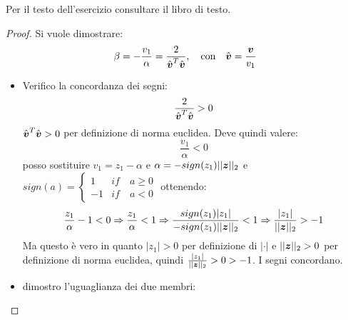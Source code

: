 \begin{exercise}[3.28]
Per il testo dell'esercizio consultare il libro di testo.
\end{exercise}
\begin{proof}
Si vuole dimostrare:
\begin{displaymath}
\beta = -\frac{v_{1}}{\alpha} = \frac{2}{\hat{\boldsymbol{v}}^{T}\hat{\boldsymbol{v}}},
\quad
\text{con} \quad \hat{\boldsymbol{v}} = \frac{\boldsymbol{v}}{v_{1}}
\end{displaymath} 
\begin{itemize}
  \item Verifico la concordanza dei segni:
  \begin{displaymath}
    \frac{2}{\hat{\boldsymbol{v}}^{T}\hat{\boldsymbol{v}}} > 0
  \end{displaymath}
  $\hat{\boldsymbol{v}}^{T}\hat{\boldsymbol{v}} > 0$ per definizione di norma euclidea.
  Deve quindi valere:
  \begin{displaymath}
  \frac{v_{1}}{\alpha} < 0
  \end{displaymath}
  posso sostituire $v_{1} = z_{1} - \alpha$ e $\alpha =
  -sign(z_{1})||\boldsymbol{z}||_{2}$ e $sign(a) = \left \{ \begin{array}{ll} 1 & if
  \quad a \geq 0 \\ -1 & if \quad a
  < 0 \end{array} \right .$ ottenendo:
  \begin{displaymath}
  \frac{z_{1}}{\alpha} - 1 < 0 \Rightarrow \frac{z_{1}}{\alpha} < 1 \Rightarrow
  \frac{sign(z_{1})|z_{1}|}{-sign(z_{1})||\boldsymbol{z}||_{2}} < 1 \Rightarrow
  \frac{|z_{1}|}{||\boldsymbol{z}||_{2}} > -1
  \end{displaymath}
  Ma questo \`e vero in quanto $|z_{1}| > 0$ per definizione di $|\cdot|$ e
  $||\boldsymbol{z}||_{2} > 0$ per definizione di norma euclidea, quindi
  $\frac{|z_{1}|}{||\boldsymbol{z}||_{2}} > 0 > -1$. I segni concordano.
  
  \item dimostro l'uguaglianza dei due membri:
  

\end{itemize}
\end{proof}
